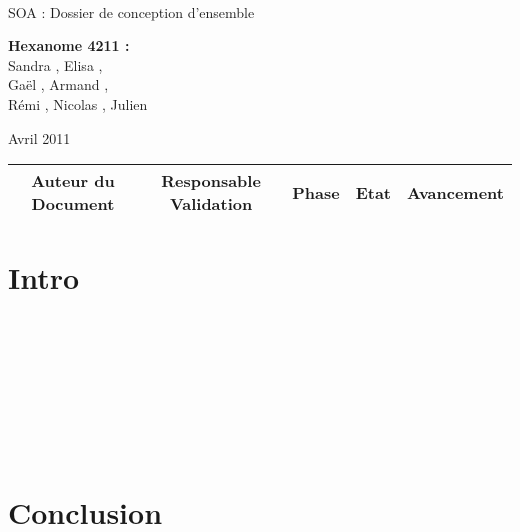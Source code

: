 \documentclass[a4paper]{article}
\begin{document}
\begin{titlepage}
~ 
\vfill
	\begin{center}
		\begin{Huge}
		SOA : Dossier de conception d'ensemble\\
		\end{Huge} 
\vfill
		\textbf{Hexanome 4211 :} 
		\\Sandra {}, Elisa , 
		\\Gaël , Armand , 
		\\Rémi , Nicolas , Julien \\

\vfill		
		\begin{Large}
		Avril 2011
		\end{Large}
\vfill
	\begin{tabular}{|c|c|c|c|c|}
 	 \hline
 	 Auteur du Document & Responsable Validation & Phase & Etat & Avancement \\
 	 \hline
 	 
 	\hline
 	
	\end{tabular}
\vfill	
	\end{center}
\vfill
\end{titlepage}

\newpage
\tableofcontents
\newpage

\section*{Intro}
\\
\\
\\
\\
\\
\\
\\






\section*{Conclusion}
\end{document}
